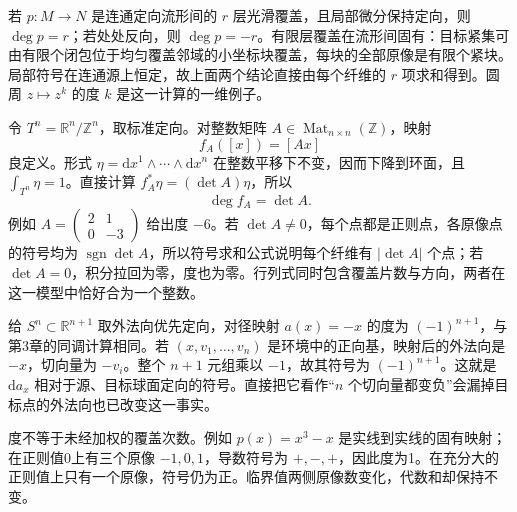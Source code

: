 若 \(p:M\to N\) 是连通定向流形间的 \(r\) 层光滑覆盖，且局部微分保持定向，则 \(\deg p=r\)；若处处反向，则 \(\deg p=-r\)。有限层覆盖在流形间固有：目标紧集可由有限个闭包位于均匀覆盖邻域的小坐标块覆盖，每块的全部原像是有限个紧块。局部符号在连通源上恒定，故上面两个结论直接由每个纤维的 \(r\) 项求和得到。圆周 \(z\mapsto z^k\) 的度 \(k\) 是这一计算的一维例子。

\begin{example}\label{g2:exm:torus-integer-matrix-degree}
	令 \(T^n=\mathbb R^n/\mathbb Z^n\)，取标准定向。对整数矩阵 \(A\in\operatorname{Mat}_{n\times n}(\mathbb Z)\)，映射
	\[
		f_A([x])=[Ax]
	\]
	良定义。形式 \(\eta=\mathrm{d}x^1\wedge\cdots\wedge\mathrm{d}x^n\) 在整数平移下不变，因而下降到环面，且 \(\int_{T^n}\eta=1\)。直接计算 \(f_A^*\eta=(\det A)\eta\)，所以
	\[
		\deg f_A=\det A.
	\]
	例如 \(A=\begin{pmatrix}2&1\\0&-3\end{pmatrix}\) 给出度 \(-6\)。若 \(\det A\ne0\)，每个点都是正则点，各原像点的符号均为 \(\operatorname{sgn}\det A\)，所以符号求和公式说明每个纤维有 \(|\det A|\) 个点；若 \(\det A=0\)，积分拉回为零，度也为零。行列式同时包含覆盖片数与方向，两者在这一模型中恰好合为一个整数。
\end{example}

\begin{example}\label{g2:exm:antipodal-differential-degree}
	给 \(S^n\subset\mathbb R^{n+1}\) 取外法向优先定向，对径映射 \(a(x)=-x\) 的度为 \((-1)^{n+1}\)，与第3章的同调计算相同。若 \((x,v_1,\ldots,v_n)\) 是环境中的正向基，映射后的外法向是 \(-x\)，切向量为 \(-v_i\)。整个 \(n+1\) 元组乘以 \(-1\)，故其符号为 \((-1)^{n+1}\)。这就是 \(\mathrm{d}a_x\) 相对于源、目标球面定向的符号。直接把它看作“\(n\) 个切向量都变负”会漏掉目标点的外法向也已改变这一事实。
\end{example}

度不等于未经加权的覆盖次数。例如 \(p(x)=x^3-x\) 是实线到实线的固有映射；在正则值0上有三个原像 \(-1,0,1\)，导数符号为 \(+,-,+\)，因此度为1。在充分大的正则值上只有一个原像，符号仍为正。临界值两侧原像数变化，代数和却保持不变。
